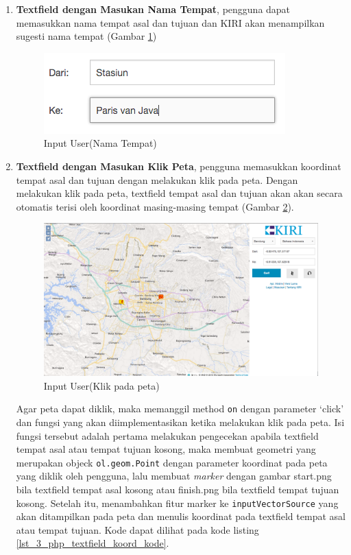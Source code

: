 \begin{enumerate}
	\item \textbf{Textfield dengan Masukan Nama Tempat}, pengguna dapat memasukkan nama tempat asal dan tujuan dan KIRI akan menampilkan sugesti nama tempat (Gambar \ref{fig:3_KIRI_textfield_nama})
	
	\begin{figure}[H]
		\centering
		\includegraphics[scale=0.5]{Gambar/KIRI-textfield-nama}
		\caption{Input User(Nama Tempat)} 
		\label{fig:3_KIRI_textfield_nama}
	\end{figure}
	
	\item \textbf{Textfield dengan Masukan Klik Peta}, pengguna memasukkan koordinat tempat asal dan tujuan dengan melakukan klik pada peta. Dengan melakukan klik pada peta, textfield tempat asal dan tujuan akan akan secara otomatis terisi oleh koordinat masing-masing tempat (Gambar \ref{fig:3_KIRI_textfield_koord}).
	
\begin{figure}[H]
	\centering
	\includegraphics[scale=0.3]{Gambar/KIRI-textfield-koord}
	\caption{Input User(Klik pada peta)} 
	\label{fig:3_KIRI_textfield_koord}
\end{figure}
	
	Agar peta dapat diklik, maka memanggil method \verb!on! dengan parameter `click' dan fungsi yang akan diimplementasikan ketika melakukan klik pada peta. Isi fungsi tersebut adalah pertama melakukan pengecekan apabila textfield tempat asal atau tempat tujuan kosong, maka membuat geometri yang merupakan objeck \verb!ol.geom.Point! dengan parameter koordinat pada peta yang diklik oleh pengguna, lalu membuat \textit{marker} dengan gambar start.png bila textfield tempat asal kosong atau finish.png bila textfield tempat tujuan kosong. Setelah itu, menambahkan fitur marker ke \verb!inputVectorSource! yang akan ditampilkan pada peta dan menulis koordinat pada textfield tempat asal atau tempat tujuan. Kode dapat dilihat pada kode listing \ref{lst_3_php_textfield_koord_kode}.
	

\end{enumerate}

